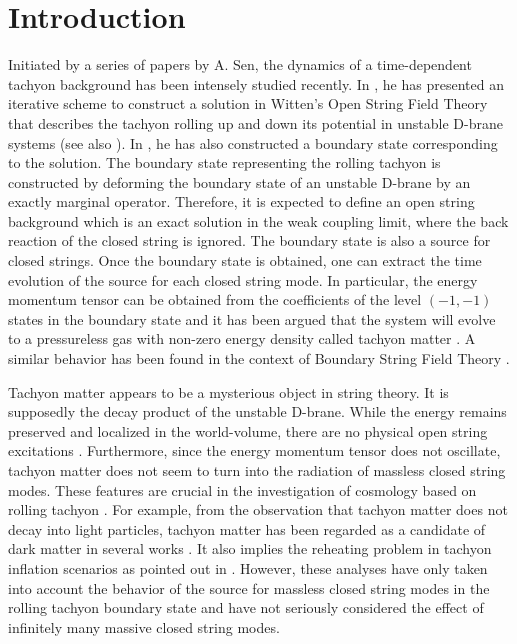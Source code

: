 \documentclass[a4paper,12pt]{article} \textheight=8.5truein
\begin{document}
\section{Introduction}
\setcounter{equation}{0} Initiated by a series of papers
\cite{Sen:2002nu,Sen:2002in,Sen:2002an} by A. Sen, the dynamics of
a time-dependent tachyon background has been intensely studied
recently. In \cite{Sen:2002nu}, he has presented an iterative
scheme to construct a solution in Witten's Open String Field
Theory that describes the tachyon rolling up and down its
potential in unstable D-brane systems (see also
\cite{Sen:2002vv,Moeller:2002vx,Kluson:2002te}). In
\cite{Sen:2002nu,Sen:2002in,Sen:2002vv}, he has also constructed a
boundary state corresponding to the solution. The boundary state
representing the rolling tachyon is constructed by deforming the
boundary state of an unstable D-brane by an exactly marginal
operator. Therefore, it is expected to define an open string
background which is an exact solution in the weak coupling limit,
where the back reaction of the closed string is ignored. The
boundary state is also a source for closed strings. Once the
boundary state is obtained, one can extract the time evolution of
the source for each closed string mode. In particular, the energy
momentum tensor can be obtained from the coefficients of the level
$(-1,-1)$ states in the boundary state and it has been argued that
the system will evolve to a pressureless gas with non-zero energy
density called tachyon matter \cite{Sen:2002in}. A similar
behavior has been found in the context of Boundary String Field
Theory \cite{Sugimoto:2002fp,Minahan:2002if}.


Tachyon matter appears to be a mysterious object in string theory.
It is supposedly the decay product of the unstable D-brane. While
the energy remains preserved and localized in the world-volume,
there are no physical open string excitations
\cite{Sen:2002an,Ishida:2002fr}. Furthermore, since the energy
momentum tensor does not oscillate, tachyon matter does not seem
to turn into the radiation of massless closed string modes. These
features are crucial in the investigation of cosmology based on
rolling tachyon \cite{cosmology,dark matter,inflation}. For example,
from the observation that tachyon matter does not decay into light
particles, tachyon matter has been regarded as a candidate of dark
matter in several works \cite{Sen:2002in,dark matter}. It also implies the
reheating problem in tachyon inflation scenarios \cite{inflation}
as pointed out in \cite{reheating}. However, these analyses have
only taken into account the behavior of the source for massless
closed string modes in the rolling tachyon boundary state and have
not seriously considered the effect of infinitely many massive closed string modes.
\end{document}
